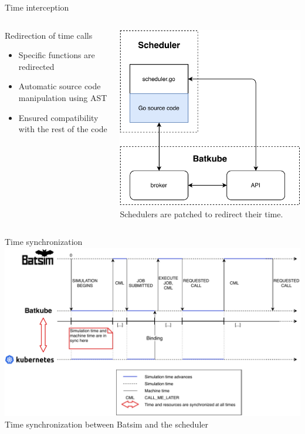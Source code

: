 \documentclass[12pt, aspectratio=43]{beamer}
\begin{document}
\begin{frame}{Time interception}
	\begin{columns}
		\begin{block}{Redirection of time calls}
			\begin{itemize}
				\item Specific functions are redirected
				\item Automatic source code manipulation using AST
				\item Ensured compatibility with the rest of the code
			\end{itemize}
		\end{block}
		
		\centering
		\includegraphics[width=\textwidth]{../imgs/synchro-go-sources.pdf}\\
		\small{Schedulers are patched to redirect their time.}
	\end{columns}
\end{frame}

\begin{frame}{Time synchronization}
	\centering
	\includegraphics[width=\textwidth]{../imgs/lignes_de_temps_simple.pdf}\\
	\small{Time synchronization between Batsim and the scheduler}
\end{frame}
\end{document}
